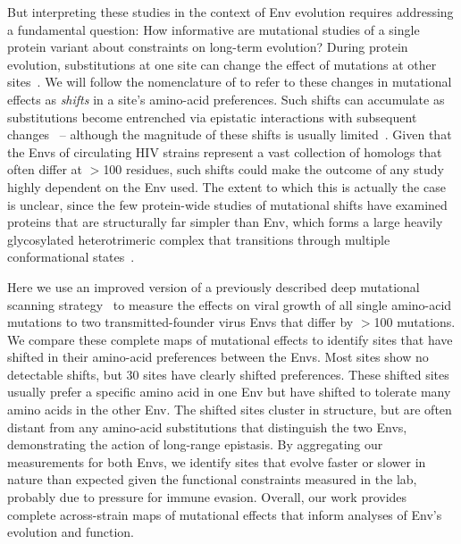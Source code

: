 \documentclass[9pt]{elife}
\begin{document}
But interpreting these studies in the context of Env evolution requires addressing a fundamental question: How informative are mutational studies of a single protein variant about constraints on long-term evolution?
During protein evolution, substitutions at one site can change the effect of mutations at other sites~\citep{natarajan2013epistasis,gong2013stability,harms2014historical,podgornaia2015pervasive,starr2016epistasis,klink2017parallel}.
We will follow the nomenclature of \citet{pollock2012amino} to refer to these changes in mutational effects as \emph{shifts} in a site's amino-acid preferences.
Such shifts can accumulate as substitutions become entrenched via epistatic interactions with subsequent changes~\citep{starr2017pervasive,pollock2012amino,shah2015contingency,bazykin2015changing} -- although the magnitude of these shifts is usually limited~\citep{doud2015site,chan2017correlation,ashenberg2013mutational,risso2014mutational}.
Given that the Envs of circulating HIV strains represent a vast collection of homologs that often differ at $>$100 residues, such shifts could make the outcome of any study highly dependent on the Env used.
The extent to which this is actually the case is unclear, since the few protein-wide studies of mutational shifts have examined proteins that are structurally far simpler than Env, which forms a large heavily glycosylated heterotrimeric complex that transitions through multiple conformational states~\citep{munro2014conformational,ozorowski2017open}.

Here we use an improved version of a previously described deep mutational scanning strategy~\citep{haddox2016experimental} to measure the effects on viral growth of all single amino-acid mutations to two transmitted-founder virus Envs that differ by $>$100 mutations.
We compare these complete maps of mutational effects to identify sites that have shifted in their amino-acid preferences between the Envs.
Most sites show no detectable shifts, but 30 sites have clearly shifted preferences.
These shifted sites usually prefer a specific amino acid in one Env but have shifted to tolerate many amino acids in the other Env.
The shifted sites cluster in structure, but are often distant from any amino-acid substitutions that distinguish the two Envs, demonstrating the action of long-range epistasis.
By aggregating our measurements for both Envs, we identify sites that evolve faster or slower in nature than expected given the functional constraints measured in the lab, probably due to pressure for immune evasion.
Overall, our work provides complete across-strain maps of mutational effects that inform analyses of Env's evolution and function.
\end{document}
